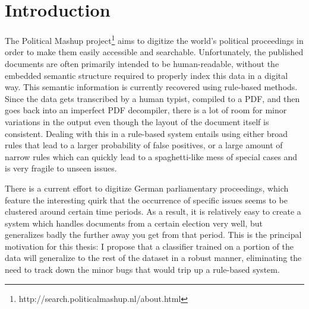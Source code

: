 \section{Introduction}
The Political Mashup
project\footnote{http://search.politicalmashup.nl/about.html} aims to digitize
the world's political proceedings in order to make them easily accessible and
searchable. Unfortunately, the published documents are often primarily intended
to be human-readable, without the embedded semantic structure required to
properly index this data in a digital way. This semantic information is
currently recovered using rule-based methods. Since the data gets transcribed by
a human typist, compiled to a PDF, and then goes back into an imperfect PDF
decompiler, there is a lot of room for minor variations in the output even
though the layout of the document itself is consistent. Dealing with this in a
rule-based system entails using either broad rules that lead to a larger
probability of false positives, or a large amount of narrow rules which can
quickly lead to a spaghetti-like mess of special cases and is very fragile to
unseen issues.

There is a current effort to digitize German parliamentary proceedings, which
feature the interesting quirk that the occurrence of specific issues seems to be
clustered around certain time periods. As a result, it is relatively easy to
create a system which handles documents from a certain election very well, but
generalizes badly the further away you get from that period. This is the
principal motivation for this thesis: I propose that a classifier trained on a
portion of the data will generalize to the rest of the dataset in a robust
manner, eliminating the need to track down the minor bugs that would trip up a
rule-based system.
